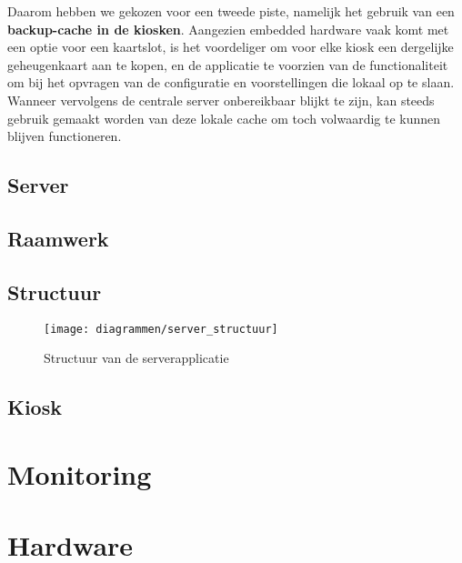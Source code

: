 Daarom hebben we gekozen voor een tweede piste, namelijk het gebruik van een \textbf{backup-cache in de kiosken}. Aangezien embedded hardware vaak komt met een optie voor een kaartslot, is het voordeliger om voor elke kiosk een dergelijke geheugenkaart aan te kopen, en de applicatie te voorzien van de functionaliteit om bij het opvragen van de configuratie en voorstellingen die lokaal op te slaan. Wanneer vervolgens de centrale server onbereikbaar blijkt te zijn, kan steeds gebruik gemaakt worden van deze lokale cache om toch volwaardig te kunnen blijven functioneren.

\section{Server}
\label{sec:server}

\section{Raamwerk}

\section{Structuur}

\begin{figure}
	\texttt{[image: diagrammen/server\_structuur]}
	\caption{Structuur van de serverapplicatie}
\end{figure}

\section{Kiosk}
\label{sec:kiosk}


%
%

\chapter{Monitoring}
\label{chap:monitoring}


%
%

\chapter{Hardware}
\label{chap:hardware}

